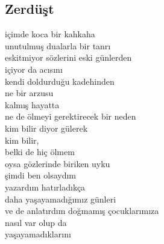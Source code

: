 \subsection{Zerdüşt}

içimde koca bir kahkaha \\
unutulmuş dualarla bir tanrı \\
eskitmiyor sözlerini eski günlerden \\
içiyor da acısını \\
kendi doldurduğu kadehinden \\

\noindent\newline
ne bir arzusu \\
kalmış hayatta \\
ne de ölmeyi gerektirecek bir neden \\
kim bilir diyor gülerek \\
kim bilir, \\
belki de hiç ölmem \\

\noindent\newline
oysa gözlerinde biriken uyku \\
şimdi ben olsaydım \\
yazardım hatırladıkça \\
daha yaşayamadığımız günleri \\
ve de anlatırdım doğmamış çocuklarımıza \\
nasıl var olup da \\
yaşayamadıklarını \\